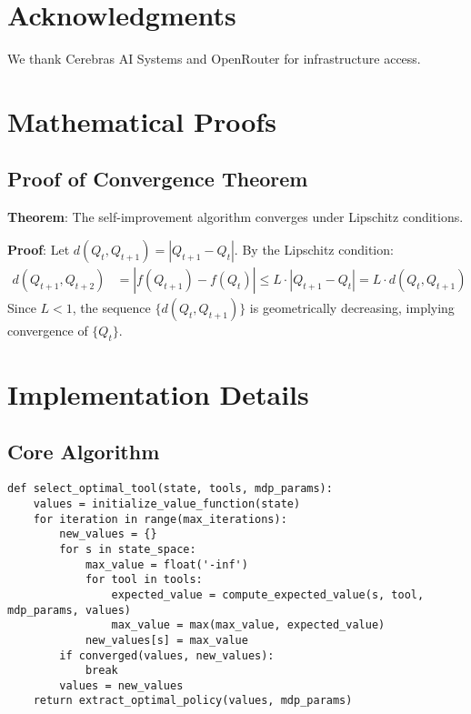 \documentclass[10pt]{article}
\begin{document}
\section{Acknowledgments}

We thank Cerebras AI Systems and OpenRouter for infrastructure access.




\appendix

\section{Mathematical Proofs}

\subsection{Proof of Convergence Theorem}

\textbf{Theorem}: The self-improvement algorithm converges under Lipschitz conditions.

\textbf{Proof}: Let $d(Q_t, Q_{t+1}) = |Q_{t+1} - Q_t|$. By the Lipschitz condition:
\begin{align}
d(Q_{t+1}, Q_{t+2}) &= |f(Q_{t+1}) - f(Q_t)| \leq L \cdot |Q_{t+1} - Q_t| = L \cdot d(Q_t, Q_{t+1})
\end{align}
Since $L < 1$, the sequence $\{d(Q_t, Q_{t+1})\}$ is geometrically decreasing, implying convergence of $\{Q_t\}$.

\section{Implementation Details}

\subsection{Core Algorithm}

\begin{lstlisting}[caption=Tool Selection MDP, basicstyle=\ttfamily\scriptsize, captionpos=b]
def select_optimal_tool(state, tools, mdp_params):
    values = initialize_value_function(state)
    for iteration in range(max_iterations):
        new_values = {}
        for s in state_space:
            max_value = float('-inf')
            for tool in tools:
                expected_value = compute_expected_value(s, tool, mdp_params, values)
                max_value = max(max_value, expected_value)
            new_values[s] = max_value
        if converged(values, new_values):
            break
        values = new_values
    return extract_optimal_policy(values, mdp_params)
\end{lstlisting}
\end{document}
